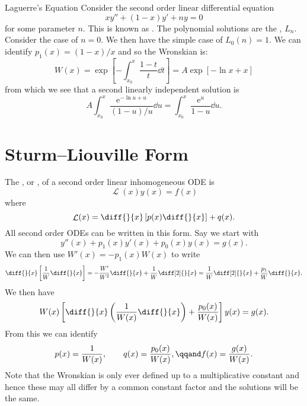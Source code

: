 \documentclass[fleqn]{NotesClass}
\newcommand*{\e}{\mathrm{e}}
\DeclareMathOperator{\linop}{\mathcal{L}}
\begin{document}
    \begin{exm}{Laguerre's Equation}{}
        Consider the second order linear differential equation
        \begin{equation}
            xy'' + (1 - x)y' + ny = 0
        \end{equation}
        for some parameter \(n\).
        This is known as .
        The polynomial solutions are the , \(L_n\).
        Consider the case of \(n = 0\).
        We then have the simple case of \(L_0(n) = 1\).
        We can identify \(p_1(x) = (1 - x)/x\) and so the Wronskian is:
        \begin{equation}
            W(x) = \exp\left[ -\int_{x_0}^{x} \frac{1 - t}{t} \dd{t} \right] = A\exp[-\ln x + x]
        \end{equation}
        from which we see that a second linearly independent solution is
        \begin{equation}
            A\int_{x_0}^{x} \frac{\e^{-\ln u + u}}{(1 - u)/u}\dd{u} = \int_{x_0}^{x} \frac{\e^{u}}{1 - u} \dd{u}.
        \end{equation}
    \end{exm}
    
    \section{Sturm--Liouville Form}
    The , or , of a second order linear inhomogeneous  ODE is
    \begin{equation}
        \linop(x)y(x) = f(x)
    \end{equation}
    where
    \begin{equation}
        \linop(x) = \diff{}{x}\left[ p(x) \diff{}{x} \right] + q(x).
    \end{equation}
    All second order ODEs can be written in this form.
    Say we start with
    \begin{equation}
        y''(x) + p_1(x)y'(x) + p_0(x)y(x) = g(x).
    \end{equation}
    We can then use \(W'(x) = -p_1(x)W(x)\) to write
    \begin{equation}
        \diff{}{x}\left[ \frac{1}{W}\diff{}{x} \right] = -\frac{W'}{W^2}\diff{}{x} + \frac{1}{W}\diff[2]{}{x} = \frac{1}{W}\diff[2]{}{x} + \frac{p_1}{W}\diff{}{x}.
    \end{equation}
    We then have
    \begin{equation}
        W(x)\left[ \diff{}{x}\left( \frac{1}{W(x)}\diff{}{x} \right) + \frac{p_0(x)}{W(x)} \right]y(x) = g(x).
    \end{equation}
    From this we can identify
    \begin{equation}
        p(x) = \frac{1}{W(x)}, \qquad q(x) = \frac{p_0(x)}{W(x)}, \qqand f(x) = \frac{g(x)}{W(x)}.
    \end{equation}
    Note that the Wronskian is only ever defined up to a multiplicative constant and hence these may all differ by a common constant factor and the solutions will be the same.
    
\end{document}
